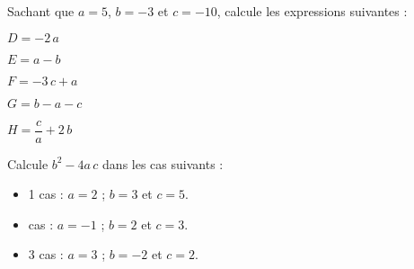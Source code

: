 \begin{exercice}
Sachant que $a = 5$, $b = -3$ et $c = -10$, calcule les expressions suivantes :

$D = -2\,a$

$E = a -b$

$F = -3\,c + a$

$G = b -a -c$

$H = \dfrac{c}{a} + 2\,b$
\end{exercice}




\begin{exercice}
Calcule $b^2 -4 a\,c$ dans les cas suivants :
\begin{itemize}
    \item 1 cas : $a = 2$ ; $b = 3$ et $c = 5$.
    \item {} cas : $a = -1$ ; $b = 2$ et $c = 3$.
    \item 3 cas : $a = 3$ ; $b = -2$ et $c = 2$.
\end{itemize}

\end{exercice}




